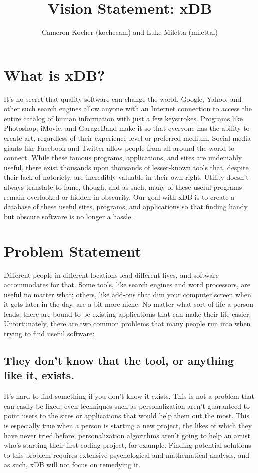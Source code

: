 \documentclass[letterpaper,12pt,titlepage]{article}
\title{Vision Statement: xDB}
\author{Cameron Kocher (kochecam) and Luke Miletta (milettal)}
\begin{document}
\maketitle

\setcounter{tocdepth}{1}
\tableofcontents
\pagebreak

\section{What is xDB?}
It's no secret that quality software can change the world. Google, Yahoo, and other such search engines allow anyone with an Internet connection to access the entire catalog of human information with just a few keystrokes. Programs like Photoshop, iMovie, and GarageBand make it so that everyone has the ability to create art, regardless of their experience level or preferred medium. Social media giants like Facebook and Twitter allow people from all around the world to connect. While these famous programs, applications, and sites are undeniably useful, there exist thousands upon thousands of lesser-known tools that, despite their lack of notoriety, are incredibly valuable in their own right. Utility doesn't always translate to fame, though, and as such, many of these useful programs remain overlooked or hidden in obscurity. Our goal with xDB is to create a database of these useful sites, programs, and applications so that finding handy but obscure software is no longer a hassle.

\section{Problem Statement}
Different people in different locations lead different lives, and software accommodates for that. Some tools, like search engines and word processors, are useful no matter what; others, like add-ons that dim your computer screen when it gets later in the day, are a bit more niche. No matter what sort of life a person leads, there are bound to be existing applications that can make their life easier. Unfortunately, there are two common problems that many people run into when trying to find useful software:
\subsection{They don't know that the tool, or anything like it, exists.}
It's hard to find something if you don’t know it exists. This is not a problem that can easily be fixed; even techniques such as personalization aren't guaranteed to point users to the sites or applications that would help them out the most. This is especially true when a person is starting a new project, the likes of which they have never tried before; personalization algorithms aren't going to help an artist who's starting their first coding project, for example. Finding potential solutions to this problem requires extensive psychological and mathematical analysis, and as such, xDB will not focus on remedying it.
\end{document}
